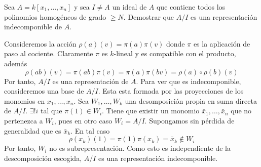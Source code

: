 \documentclass[twoside]{article}
\begin{document}
\newpage




\begin{ejercicio}{1.24}
Sea $A = k[x_1,\dotsc,x_n]$ y sea $I\neq A$ un ideal de $A$ que contiene todos los polinomios homogéneos de grado $\geq N$. Demostrar que $A/I$ es una representación indecomponible de $A$. 
\end{ejercicio}
\begin{solucion}
Consideremos la acción $\rho(a)(v) = \pi(a)\pi(v)$ donde $\pi$ es la aplicación de paso al cociente. Claramente $\pi$ es $k$-lineal y es compatible con el producto, además
$$
\rho(ab)(v) = \pi(ab)\pi(v) =\pi(a)\pi(bv) = \rho(a)\circ \rho(b)(v)
$$
Por tanto, $A/I$ es una representación de $A$. Para ver que es indecomponible, consideremos una base de $A/I$. Esta esta formada por las proyecciones de los monomios en $x_1,\dotsc,x_n$. Sea $W_1,\dotsc,W_k$ una desomposición propia en suma directa de $A/I$. $\exists! i$ tal que $\pi(1)\in W_i$. Tiene que existir un monomio $\bar{x}_1,\dotsc,\bar{x}_n$ que no pertenezca a $W_i$, pues en otro caso $W_i = A/I$. Supongamos sin pérdida de generalidad que es $\bar{x}_k$. En tal caso
$$
\rho(x_k)(1) = \pi(1)\pi(x_k) = \bar{x}_k \notin W_i
$$
Por tanto, $W_i$ no es subrepresentación. Como esto es independiente de la descomposición escogida, $A/I$ es una representación indecomponible.
\end{solucion}


\newpage
\end{document}
